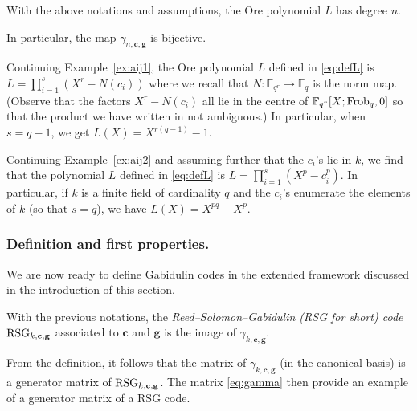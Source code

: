 \documentclass[a4paper]{llncs}
\newcommand{\FF}{\mathbb F}
\newcommand{\Frob}{\textrm{\rm Frob}}
\newcommand{\bc}{\textbf{c}}
\newcommand{\bg}{\textbf{g}}
\newcommand{\RSG}{\textrm{\rm RSG}}
\begin{document}
\begin{lemma}
\label{lem:llcmaij}
With the above notations and assumptions, the Ore polynomial $L$
has degree $n$.

\noindent
In particular, the map $\gamma_{n,\bc,\bg}$ is bijective.
\end{lemma}

{\small
\begin{example}
Continuing Example~\ref{ex:aij1}, 
the Ore polynomial $L$ defined in \eqref{eq:defL} is
$L = \prod_{i=1}^s (X^r - N(c_i))$
where we recall that $N : \FF_{q^r} \to \FF_q$ is the norm map.
(Observe that the factors $X^r - N(c_i)$ all lie in the centre of
$\FF_{q^r}[X;\Frob_q,0]$ so that the product we have written in
not ambiguous.)
In particular, when $s = q-1$, we get $L(X) = X^{r(q-1)} - 1$.
\end{example}

\begin{example}
\label{ex:L}
Continuing Example~\ref{ex:aij2} and assuming further that the
$c_i$'s lie in $k$, we find that the polynomial $L$ defined in
\eqref{eq:defL} is $L = \prod_{i=1}^s (X^p - c_i^p)$.
In particular, if $k$ is a finite field of cardinality $q$ and
the $c_i$'s enumerate the elements of $k$ (so that $s=q$), we
have $L(X) = X^{pq} - X^p$.
\end{example}}

\subsubsection*{Definition and first properties.}

We are now ready to define Gabidulin codes in the extended framework
discussed in the introduction of this section.

\begin{definition}
With the previous notations, the \emph{Reed--Solomon--Gabidulin (RSG for 
short) code} $\RSG_{k,\bc,\bg}$ associated to $\bc$ and $\bg$ is the 
image of $\gamma_{k,\bc,\bg}$.
\end{definition}

\begin{remark}
From the definition, it follows that the matrix of $\gamma_{k,\bc,\bg}$
(in the canonical basis) is a generator matrix of $\RSG_{k,\bc,\bg}$.
The matrix \eqref{eq:gamma} then provide an example of a generator 
matrix of a RSG code.
\end{remark}
\end{document}
